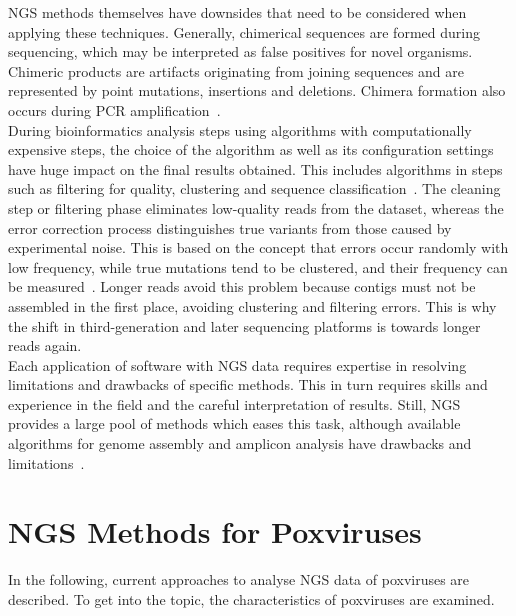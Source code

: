 NGS methods themselves have downsides that need to be considered when applying these techniques. Generally, chimerical sequences are formed during sequencing, which may be interpreted as false positives for novel organisms. Chimeric products are artifacts originating from joining sequences and are represented by point mutations, insertions and deletions. Chimera formation also occurs during PCR amplification~\cite{zylstra1998pcr}.\\
During bioinformatics analysis steps using algorithms with computationally expensive steps, the choice of the algorithm as well as its configuration settings have huge impact on the final results obtained. This includes algorithms in steps such as filtering for quality, clustering and sequence classification~\cite{kopylova2016open}. The cleaning step or filtering phase eliminates low-quality reads from the dataset, whereas the error correction process distinguishes true variants from those caused by experimental noise. This is based on the concept that errors occur randomly with low frequency, while true mutations tend to be clustered, and their frequency can be measured~\cite{zagordi2010error}. Longer reads avoid this problem because contigs must not be assembled in the first place, avoiding clustering and filtering errors. This is why the shift in third-generation and later sequencing platforms is towards longer reads again. \\
Each application of software with NGS data requires expertise in resolving limitations and drawbacks of specific methods. This in turn requires skills and experience in the field and the careful interpretation of results. Still, NGS provides a large pool of methods which eases this task, although available algorithms for genome assembly and amplicon analysis have drawbacks and limitations~\cite{finotello2012comparative}.

\section{NGS Methods for Poxviruses}
In the following, current approaches to analyse NGS data of poxviruses are described. To get into the topic, the characteristics of poxviruses are examined.

